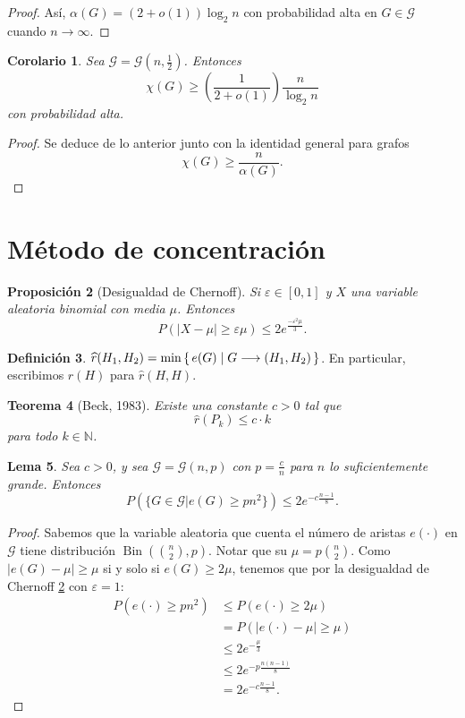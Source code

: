\documentclass[12pt]{report}
\theoremstyle{plain}
\newtheorem{theorem}{Teorema}[section]
\newtheorem{lemma}[theorem]{Lema}
\newtheorem{proposition}[theorem]{Proposición}
\newtheorem{corollary}[theorem]{Corolario}
\theoremstyle{definition}
\newtheorem{definition}[theorem]{Definición}
\newcommand{\naturals}{\mathbb{N}}
\newcommand{\abs}[1]{\left \vert #1 \right \vert}
\renewcommand{\hat}[1]{\widehat{#1}}
\begin{document}
\begin{proof}
Así, $\alpha (G) = (2 + o(1))  \log_2 n$ con probabilidad alta en $G \in \mathcal G$ cuando $n \to \infty$.


\end{proof}

\begin{corollary}
Sea $\mathcal G = \mathcal G(n, \frac 1 2)$. Entonces
\[
\chi (G) \geq \left (\frac 1 {2 + o(1)} \right ) \frac{n}{\log_2 n}
\]
con probabilidad alta.
\end{corollary}
\begin{proof}
Se deduce de lo anterior junto con la identidad general para grafos
\[
    \chi (G) \geq \frac{n}{\alpha(G)}.
\]
\end{proof}


\section{Método de concentración}



\begin{proposition}[Desigualdad de Chernoff]\label{proposition:desigualdad de chernoff}
Si $\varepsilon \in [0, 1]$ y $X$ una variable aleatoria binomial con media $\mu$. Entonces
\[
    P (\abs{X - \mu} \geq \varepsilon \mu) \leq 2 e^{\frac{-\varepsilon^2 \mu}{3}}.
\]
\end{proposition}

\begin{definition}
$\hat r (H_1,H_2) = \min \set{e(G) | G \longrightarrow (H_1,H_2)}$. En particular, escribimos $\hat r (H)$ para $\hat r (H,H)$.
\end{definition}

\begin{theorem}[Beck, 1983]\label{th:teorema de Beck}
Existe una constante $c > 0$ tal que
\[
    \hat r (P_k) \leq c \cdot k
\]
para todo $k \in \naturals$.
\end{theorem}


\begin{lemma}
Sea $c > 0$, y sea $\mathcal G = \mathcal G (n,p)$ con $p = \frac c n$ para $n$ lo suficientemente grande. Entonces
\[
    P\left (\{G \in \mathcal G | e(G) \geq p n^2\} \right ) \leq 2e^{- c \frac {n-1} 8}.
\]
\end{lemma}
\begin{proof}
Sabemos que la variable aleatoria que cuenta el número de aristas $e(\cdot) $ en $\mathcal G$ tiene distribución $\operatorname{Bin} (\binom n 2 , p)$. Notar que su $\mu = p \binom n2$. Como $\abs {e(G) - \mu} \geq \mu$ si y solo si $e(G) \geq 2 \mu$, tenemos que por la desigualdad de Chernoff \ref{proposition:desigualdad de chernoff} con $\varepsilon = 1$:
\begin{align*}
P(e(\cdot) \geq p n^2) &\leq P (e(\cdot ) \geq 2 \mu) \\
&= P(\abs{e(\cdot) - \mu} \geq \mu)  \\
&\leq 2 e^{- \frac \mu 3} \\
&\leq 2 e^{- p \frac{n (n-1)}{8}} \\
&= 2e^{- c \frac {n-1} 8}.
\end{align*}
\end{proof}
\end{document}
